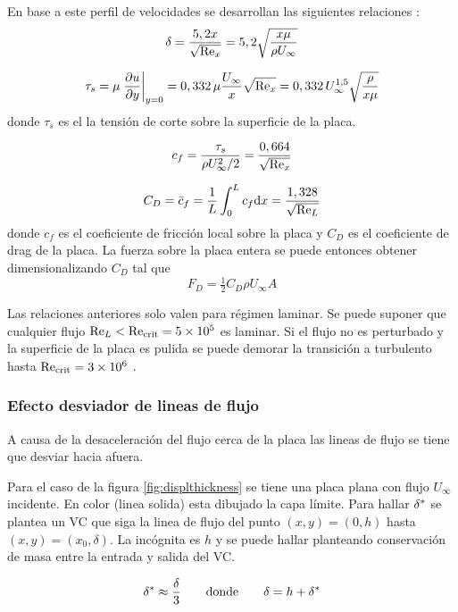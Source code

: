 En base a este perfil de velocidades se desarrollan las siguientes relaciones \citep{durst2008fluid}:
\begin{equation}
    \delta=\frac{5,2x}{\sqrt{\textrm{Re}_x}}=5,2\sqrt{\frac{x\mu}{\rho U_\infty}}
\end{equation}

\begin{equation}
    \tau_s=\mu \left. \frac{\partial u}{\partial y}\right|_{y=0}=0,332\,\mu\frac{U_\infty}{x}\sqrt{\textrm{Re}_x}=0,332\, U_\infty^{1,5}\sqrt{\frac{\rho}{x\mu}}
\end{equation}
donde $\tau_s$ es el la tensión de corte sobre la superficie de la placa. 

\begin{equation}
    c_f=\frac{\tau_s}{\rho U_\infty^2/2}=\frac{0,664}{\sqrt{\textrm{Re}_x}}
\end{equation}

\begin{equation}
    C_D=\bar{c}_f=\frac{1}{L}\int_0^Lc_f\textrm{d} x=\frac{1,328}{\sqrt{\textrm{Re}_L}}
\end{equation}
donde $c_f$ es el coeficiente de fricción local sobre la placa y $C_D$ es el coeficiente de drag de la placa. La fuerza sobre la placa entera se puede entonces obtener dimensionalizando $C_D$ tal que
\[
F_D=\tfrac{1}{2}C_D \rho U_\infty A
\]

Las relaciones anteriores solo valen para régimen laminar. Se puede suponer que cualquier flujo $\textrm{Re}_L<\textrm{Re}_{{\mathrm{crit}}}=\num{5e5}$ es laminar. Si el flujo no es perturbado y la superficie de la placa es pulida se puede demorar la transición a turbulento hasta $\textrm{Re}_{{\mathrm{crit}}}=\num{3e6}$ \citep{kreith2011principles}.

\subsubsection*{Efecto desviador de lineas de flujo}
A causa de la desaceleración del flujo cerca de la placa las lineas de flujo se tiene que desviar hacia afuera. 

Para el caso de la figura \ref{fig:displthickness} se tiene una placa plana con flujo $U_\infty$ incidente. En color (linea solida) esta dibujado la capa límite. Para hallar $\delta^{*}$ se plantea un VC que siga la linea de flujo del punto $(x,y)=(0,h)$ hasta $(x,y)=(x_0,\delta)$. La incógnita es $h$ y se puede hallar planteando conservación de masa entre la entrada y salida del VC.

\begin{equation}
    \delta^{*} \approx \frac{\delta}{3}  \qquad \textrm{donde}\qquad  \delta=h+\delta^{*}
\end{equation}


